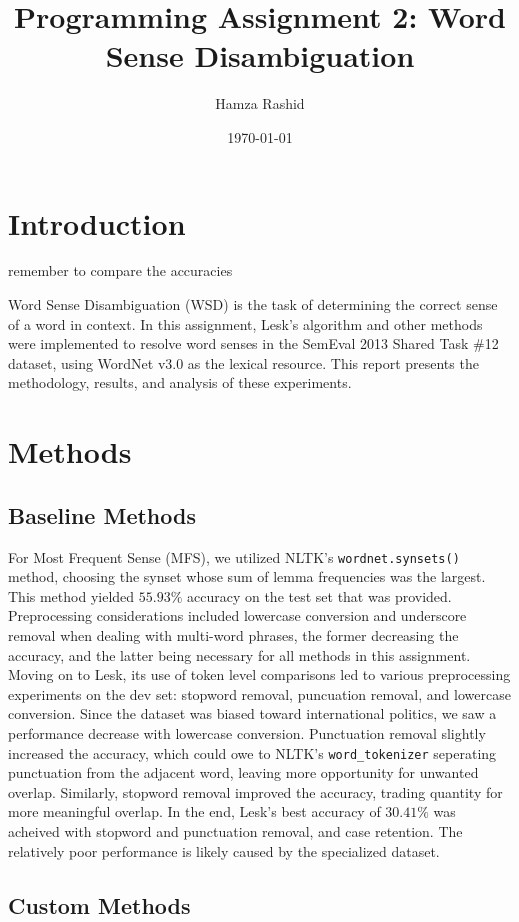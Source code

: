 \documentclass[11pt]{article}
\title{Programming Assignment 2: Word Sense Disambiguation}
\author{Hamza Rashid}
\date{\today}
\begin{document}
\maketitle

\section{Introduction}
remember to compare the accuracies

Word Sense Disambiguation (WSD) is the task of determining the correct sense of a word in context. 
In this assignment, Lesk’s algorithm and other methods were implemented to resolve word senses 
in the SemEval 2013 Shared Task \#12 dataset, using WordNet v3.0 as the lexical resource. 
This report presents the methodology, results, and analysis of these experiments.

\section{Methods}
\subsection{Baseline Methods}
For Most Frequent Sense (MFS), we utilized NLTK's \texttt{wordnet.synsets()} method, choosing the synset whose sum of 
lemma frequencies was the largest. This method yielded $55.93\%$ accuracy on the test set that was provided. 
Preprocessing considerations included lowercase conversion and underscore removal when dealing with multi-word phrases,
the former decreasing the accuracy, and the latter being necessary for all methods in this assignment. 
Moving on to Lesk, its use of token level comparisons led to various preprocessing experiments on the dev set: stopword removal, puncuation removal, and lowercase conversion. 
Since the dataset was biased toward international politics, we saw a performance decrease with lowercase conversion. Punctuation removal 
slightly increased the accuracy, which could owe to NLTK's \texttt{word\_tokenizer} seperating 
punctuation from the adjacent word, leaving more opportunity for unwanted overlap. 
Similarly, stopword removal improved the accuracy, trading quantity for more meaningful overlap. 
In the end, Lesk's best accuracy of $30.41\%$ was acheived with stopword and punctuation removal,
and case retention. The relatively poor performance is likely caused by the specialized dataset.

\subsection{Custom Methods}
\end{document}
